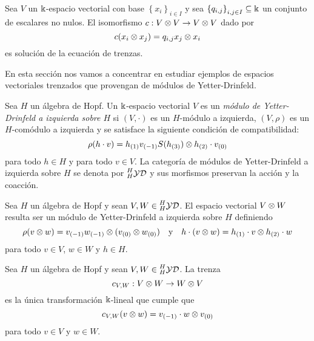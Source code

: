 \documentclass[a4paper,oneside,fleqn,11pt,../tesis.tex]{subfiles}
\newcommand{\yetter}{\prescript{H}{H}{\mathcal{YD}}}
\begin{document}
\begin{example}
	Sea $V$ un $\Bbbk$-espacio vectorial con base $\left\lbrace x_i \right\rbrace_{i \in I}$
	y sea $\left\lbrace q_{i, j} \right\rbrace_{i, j \in I} \subseteq \Bbbk$ un conjunto de escalares no nulos.
	El isomorfismo $c:V \otimes V \to V \otimes V$ dado por
	\[
		c(x_i \otimes x_j) = q_{i, j} x_j \otimes x_i
	\] es solución de la ecuación de trenzas.
\end{example}

En esta sección nos vamos a concentrar en estudiar ejemplos de espacios vectoriales trenzados que provengan de módulos
de Yetter-Drinfeld.

\begin{definition}
	Sea $H$ un álgebra de Hopf. Un $\Bbbk$-espacio vectorial $V$ es un \emph{módulo de Yetter-Drinfeld a izquierda sobre $H$}
	si $\left(V, \cdot\right)$ es un $H$-módulo a izquierda, $(V, \rho)$ es un $H$-comódulo a izquierda
	y se satisface la siguiente condición de compatibilidad:
	\[
		\rho(h \cdot v) = h_{(1)}v_{(-1)}S(h_{(3)}) \otimes h_{(2)} \cdot v_{(0)}	
	\]
	para todo $h \in H$ y para todo $v \in V$.
	La categoría de módulos de Yetter-Drinfeld a izquierda sobre $H$ se denota por $\yetter$ y
	sus morfismos preservan la acción y la coacción.
\end{definition}

Sea $H$ un álgebra de Hopf y sean $V, W \in \yetter$. El espacio vectorial $V \otimes W$ resulta ser un módulo de Yetter-Drinfeld
a izquierda sobre $H$ definiendo
\[
	\rho(v \otimes w) = v_{(-1)}w_{(-1)} \otimes (v_{(0)} \otimes w_{(0)}) \quad\text{y}\quad h\cdot (v \otimes w) = h_{(1)}\cdot v \otimes h_{(2)} \cdot w
\]
para todo $v \in V$, $w \in W$ y $h \in H$.

\begin{definition}
	Sea $H$ un álgebra de Hopf y sean $V, W \in \yetter$. La trenza
	\[
		c_{V, W}: V\otimes W \to W\otimes V
	\] es la única transformación $\Bbbk$-lineal que cumple que
	\[
		c_{V, W}(v \otimes w) = v_{(-1)} \cdot w \otimes v_{(0)}
	\]
	para todo $v \in V$ y $w \in W$.
\end{definition}
\end{document}
